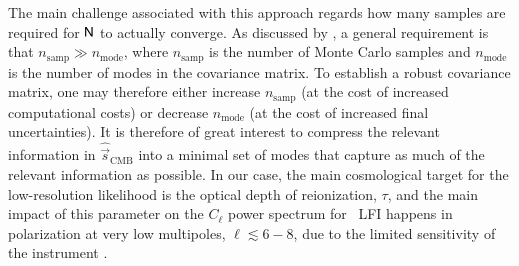 \documentclass[twocolumn]{aa}
\newcommand{\s}[0]{\vec{s}}
\newcommand{\N}[0]{\tens{N}}
\begin{document}
The main challenge associated with this approach regards how many
samples are required for $\N$ to actually converge. As discussed by
\citet{sellentin2016}, a general requirement is that
$n_{\mathrm{samp}} \gg n_{\mathrm{mode}}$, where $n_{\mathrm{samp}}$
is the number of Monte Carlo samples and $n_{\mathrm{mode}}$ is the
number of modes in the covariance matrix. To establish a robust
covariance matrix, one may therefore either increase
$n_{\mathrm{samp}}$ (at the cost of increased computational costs) or
decrease $n_{\mathrm{mode}}$ (at the cost of increased final
uncertainties). It is therefore of great interest to compress the
relevant information in $\hat{\s}_{\mathrm{CMB}}$ into a minimal set
of modes that capture as much of the relevant information as
possible. In our case, the main cosmological target for the
low-resolution likelihood is the optical depth of reionization,
$\tau$, and the main impact of this parameter on the $C_{\ell}$ power
spectrum for \Planck\ LFI happens in polarization at very low
multipoles, $\ell \lesssim 6-8$, due to the limited sensitivity of the
instrument \citep{planck2016-l05}.
\end{document}
